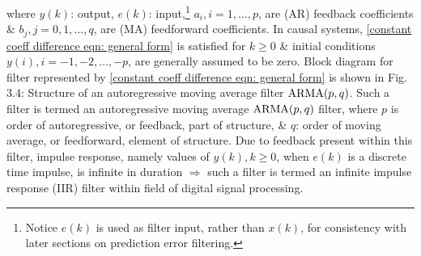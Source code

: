 \documentclass{article}
\begin{document}
\begin{enumerate}
\begin{itemize}
\begin{itemize}
\begin{equation}
			\end{equation}
			where $y(k)$: output, $e(k)$: input,\footnote{Notice $e(k)$ is used as filter input, rather than $x(k)$, for consistency with later sections on prediction error filtering.} $a_i,i = 1,\ldots,p$, are (AR) feedback coefficients \& $b_j,j = 0,1,\ldots,q$, are (MA) feedforward coefficients. In causal systems, \eqref{constant coeff difference eqn: general form} is satisfied for $k\ge0$ \& initial conditions $y(i),i = -1,-2,\ldots,-p$, are generally assumed to be zero. Block diagram for filter represented by \eqref{constant coeff difference eqn: general form} is shown in {\sf Fig. 3.4: Structure of an autoregressive moving average filter ${\rm ARMA}(p,q)$}. Such a filter is termed an autoregressive moving average ${\rm ARMA}(p,q)$ filter, where $p$ is order of autoregressive, or feedback, part of structure, \& $q$: order of moving average, or feedforward, element of structure. Due to feedback present within this filter, impulse response, namely values of $y(k),k\ge0$, when $e(k)$ is a discrete time impulse, is infinite in duration $\Rightarrow$ such a filter is termed an infinite impulse response (IIR) filter within field of digital signal processing.
			

\end{itemize}
\end{itemize}
\end{enumerate}
\end{document}
